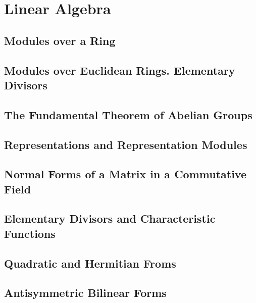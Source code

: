 \section{Linear Algebra}

\subsection{Modules over a Ring}

\subsection{Modules over Euclidean Rings. Elementary Divisors}

\subsection{The Fundamental Theorem of Abelian Groups}

\subsection{Representations and Representation Modules}

\subsection{Normal Forms of a Matrix in a Commutative Field}

\subsection{Elementary Divisors and Characteristic Functions}

\subsection{Quadratic and Hermitian Froms}

\subsection{Antisymmetric Bilinear Forms}